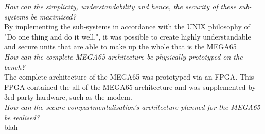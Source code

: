 \textit{How can the simplicity, understandability and hence, the security of these sub-systems be maximised?}\\
By implementing the sub-systems in accordance with the UNIX philosophy of "Do one thing and do it well.", it was possible to create highly understandable and secure units that are able to make up the whole that is the MEGA65
\\
\textit{How can the complete MEGA65 architecture be physically prototyped on the bench?}\\
The complete architecture of the MEGA65 was prototyped via an FPGA. This FPGA contained the all of the MEGA65 architecture and was supplemented by 3rd party hardware, such as the modem.
\\
\textit{How can the secure compartmentalisation's architecture planned for the MEGA65 be realised?}\\
blah
